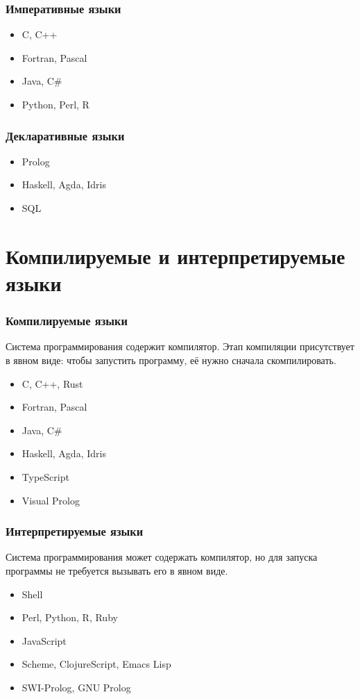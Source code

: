 \documentclass[9pt,pdf]{beamer}
\begin{document}
\begin{frame}
	\frametitle{Императивные языки}
	\begin{itemize}
		\item C, C++
		\item Fortran, Pascal
		\item Java, C\#
		\item Python, Perl, R
	\end{itemize}
\end{frame}

\begin{frame}
	\frametitle{Декларативные языки}
	\begin{itemize}
		\item Prolog
		\item Haskell, Agda, Idris
		\item SQL
	\end{itemize}
\end{frame}

\section{Компилируемые и интерпретируемые языки}

\begin{frame}
	\frametitle{Компилируемые языки}
	Система программирования содержит компилятор. Этап компиляции присутствует в явном виде: чтобы запустить программу, её нужно сначала скомпилировать.
	\begin{itemize}
		\item C, C++, Rust
		\item Fortran, Pascal
		\item Java, C\#
		\item Haskell, Agda, Idris
		\item TypeScript
		\item Visual Prolog
	\end{itemize}
\end{frame}

\begin{frame}
	\frametitle{Интерпретируемые языки}
	Система программирования может содержать компилятор, но для запуска программы не требуется вызывать его в явном виде.
	\begin{itemize}
		\item Shell
		\item Perl, Python, R, Ruby
		\item JavaScript
		\item Scheme, ClojureScript, Emacs Lisp
		\item SWI-Prolog, GNU Prolog
	\end{itemize}
\end{frame}
\end{document}
